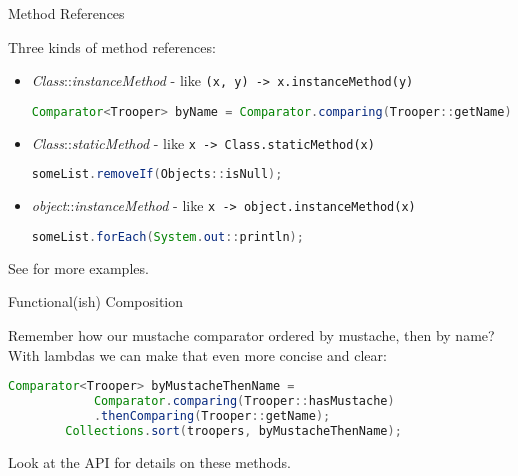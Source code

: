 \documentclass{beamer}
\begin{document}
\begin{frame}[fragile]{Method References}

Three kinds of method references:
\begin{itemize}

\item {\it Class}::{\it instanceMethod} - like {\tt (x, y) -> x.instanceMethod(y)}
\begin{lstlisting}[language=Java]
Comparator<Trooper> byName = Comparator.comparing(Trooper::getName);
\end{lstlisting}

\item {\it Class}::{\it staticMethod} - like {\tt x -> Class.staticMethod(x)}
\begin{lstlisting}[language=Java]
someList.removeIf(Objects::isNull);
\end{lstlisting}


\item {\it object}::{\it instanceMethod} - like {\tt x -> object.instanceMethod(x)}
\begin{lstlisting}[language=Java]
someList.forEach(System.out::println);
\end{lstlisting}

\end{itemize}

See  for more examples.

\end{frame}

\begin{frame}[fragile]{Functional(ish) Composition}

Remember how our mustache comparator ordered by mustache, then by name?\\

With lambdas we can make that even more concise and clear:

\begin{lstlisting}[language=Java]
        Comparator<Trooper> byMustacheThenName =
            Comparator.comparing(Trooper::hasMustache)
            .thenComparing(Trooper::getName);
        Collections.sort(troopers, byMustacheThenName);
\end{lstlisting}

Look at the  API for details on these methods.

\end{frame}







\end{document}
